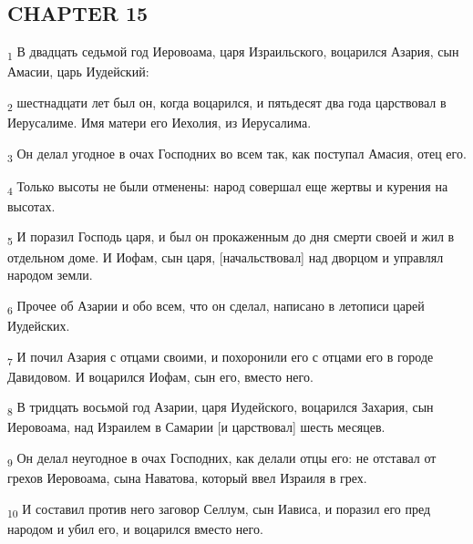 \subsection{CHAPTER 15}
\begin{tcolorbox}
\textsubscript{1} В двадцать седьмой год Иеровоама, царя Израильского, воцарился Азария, сын Амасии, царь Иудейский:
\end{tcolorbox}
\begin{tcolorbox}
\textsubscript{2} шестнадцати лет был он, когда воцарился, и пятьдесят два года царствовал в Иерусалиме. Имя матери его Иехолия, из Иерусалима.
\end{tcolorbox}
\begin{tcolorbox}
\textsubscript{3} Он делал угодное в очах Господних во всем так, как поступал Амасия, отец его.
\end{tcolorbox}
\begin{tcolorbox}
\textsubscript{4} Только высоты не были отменены: народ совершал еще жертвы и курения на высотах.
\end{tcolorbox}
\begin{tcolorbox}
\textsubscript{5} И поразил Господь царя, и был он прокаженным до дня смерти своей и жил в отдельном доме. И Иофам, сын царя, [начальствовал] над дворцом и управлял народом земли.
\end{tcolorbox}
\begin{tcolorbox}
\textsubscript{6} Прочее об Азарии и обо всем, что он сделал, написано в летописи царей Иудейских.
\end{tcolorbox}
\begin{tcolorbox}
\textsubscript{7} И почил Азария с отцами своими, и похоронили его с отцами его в городе Давидовом. И воцарился Иофам, сын его, вместо него.
\end{tcolorbox}
\begin{tcolorbox}
\textsubscript{8} В тридцать восьмой год Азарии, царя Иудейского, воцарился Захария, сын Иеровоама, над Израилем в Самарии [и царствовал] шесть месяцев.
\end{tcolorbox}
\begin{tcolorbox}
\textsubscript{9} Он делал неугодное в очах Господних, как делали отцы его: не отставал от грехов Иеровоама, сына Наватова, который ввел Израиля в грех.
\end{tcolorbox}
\begin{tcolorbox}
\textsubscript{10} И составил против него заговор Селлум, сын Иависа, и поразил его пред народом и убил его, и воцарился вместо него.
\end{tcolorbox}
